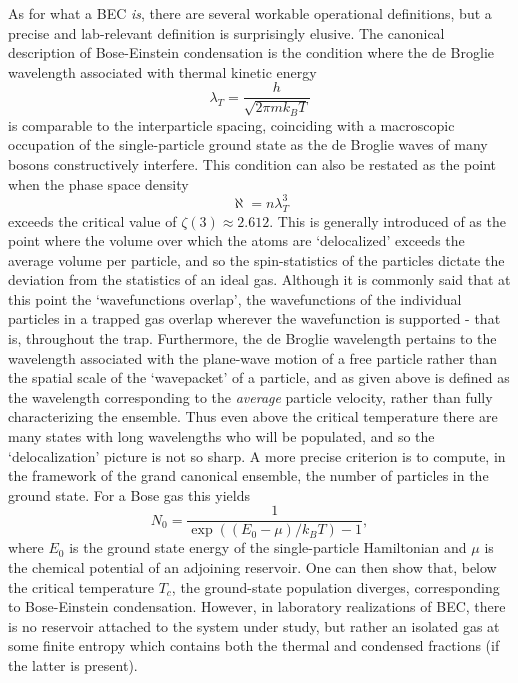 	As for what a BEC \emph{is}, there are several workable operational definitions, but a precise and lab-relevant definition is surprisingly elusive.
	The canonical description of Bose-Einstein condensation is the condition where the de Broglie wavelength associated with thermal kinetic energy
	\begin{equation}
		\lambda_T = \frac{h}{\sqrt{2\pi m k_B T}}
	\end{equation}
	is comparable to the interparticle spacing, coinciding with a macroscopic occupation of the single-particle ground state as the de Broglie waves of many bosons constructively interfere.
	This condition can also be restated as the point when the phase space density
	\begin{equation}
		\aleph = n \lambda_T^3
	\end{equation}
	exceeds the critical value of $\zeta(3)\approx2.612$. 
	This is generally introduced of as the point where the volume over which the atoms are `delocalized'  exceeds the average volume per particle, and so the spin-statistics of the particles dictate the deviation from the statistics of an ideal gas.
	Although it is commonly said that at this point the `wavefunctions overlap', the wavefunctions of the individual particles in a trapped gas overlap wherever the wavefunction is supported - that is, throughout the trap.
	Furthermore, the de Broglie wavelength pertains to the wavelength associated with the plane-wave motion of a free particle rather than the spatial scale of the `wavepacket' of a particle, and as given above is defined as the wavelength corresponding to the \emph{average} particle velocity, rather than fully characterizing the ensemble. 
	Thus even above the critical temperature there are many states with long wavelengths who will be populated, and so the `delocalization' picture is not so sharp.
	A more precise criterion is to compute, in the framework of the grand canonical ensemble, the number of particles in the ground state. For a Bose gas this yields
	\begin{equation}
		N_0 = \frac{1}{\exp((E_0-\mu)/k_B T)-1},
	\end{equation}
	where $E_0$ is the ground state energy of the single-particle Hamiltonian and $\mu$ is the chemical potential of an adjoining reservoir. 
	One can then show that, below the critical temperature $T_c$, the ground-state population diverges, corresponding to Bose-Einstein condensation.
	However, in laboratory realizations of BEC, there is no reservoir attached to the system under study, but rather an isolated gas at some finite entropy which contains both the thermal and condensed fractions (if the latter is present). 
	
